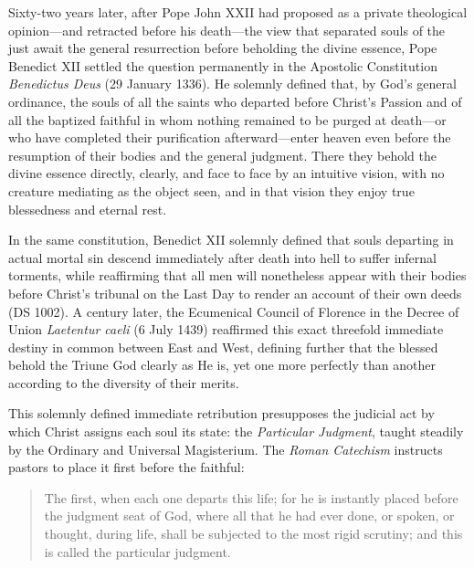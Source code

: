 Sixty-two years later, after Pope John XXII had proposed as a private theological opinion---and retracted before his death---the view that separated souls of the just await the general resurrection before beholding the divine essence, Pope Benedict XII settled the question permanently in the Apostolic Constitution \textit{Benedictus Deus} (29 January 1336). He solemnly defined that, by God's general ordinance, the souls of all the saints who departed before Christ's Passion and of all the baptized faithful in whom nothing remained to be purged at death---or who have completed their purification afterward---enter heaven even before the resumption of their bodies and the general judgment. There they behold the divine essence directly, clearly, and face to face by an intuitive vision, with no creature mediating as the object seen, and in that vision they enjoy true blessedness and eternal rest.

In the same constitution, Benedict XII solemnly defined that souls departing in actual mortal sin descend immediately after death into hell to suffer infernal torments, while reaffirming that all men will nonetheless appear with their bodies before Christ's tribunal on the Last Day to render an account of their own deeds (DS 1002). A century later, the Ecumenical Council of Florence in the Decree of Union \textit{Laetentur caeli} (6 July 1439) reaffirmed this exact threefold immediate destiny in common between East and West, defining further that the blessed behold the Triune God clearly as He is, yet one more perfectly than another according to the diversity of their merits.

This solemnly defined immediate retribution presupposes the judicial act by which Christ assigns each soul its state: the \textit{Particular Judgment}, taught steadily by the Ordinary and Universal Magisterium. The \textit{Roman Catechism} instructs pastors to place it first before the faithful:

\begin{quote}
The first, when each one departs this life; for he is instantly placed before the judgment seat of God, where all that he had ever done, or spoken, or thought, during life, shall be subjected to the most rigid scrutiny; and this is called the particular judgment.
\end{quote}

